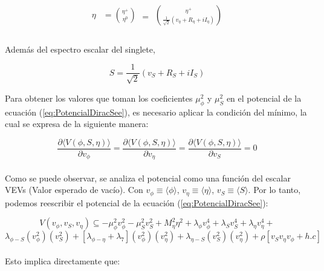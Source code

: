 \documentclass[12pt]{article}
\begin{document}
\begin{equation}
\label{eq:campoeta}
\begin{aligned}
 \eta & = \binom{\eta^{+}}{\eta^{0} } \\ 
\end{aligned} = 
\begin{aligned}
 \binom{\eta^{+}}{\frac{1}{\sqrt{2}}(v_\eta + R_\eta + iI_\eta) } \\ 
\end{aligned}
\end{equation} \\

Además del  espectro escalar del singlete,

\begin{equation}
    \label{eq:singlete}
    S=\frac{1}{\sqrt{2}}(v_S+ R_S+iI_S)
\end{equation}


Para obtener los valores que toman los coeficientes \( \mu_\phi^2\) y \( \mu_S^2\) en el potencial de la ecuación (\ref{eq:PotencialDiracSee}), es necesario aplicar la condición del mínimo, la cual se expresa de la siguiente manera: 



\begin{equation}
    \frac{\partial{\langle V(\phi, S, \eta) }\rangle }{\partial v_\phi} = \frac{\partial{\langle V(\phi, S, \eta) }\rangle }{\partial v_\eta}= \frac{\partial{\langle V(\phi, S, \eta) }\rangle }{\partial v_S}= 0
\end{equation}\\ 

Como se puede observar, se analiza el potencial como una función del escalar VEVs (Valor esperado de vacío). Con  $v_\phi \equiv \langle \phi \rangle$,  $v_\eta \equiv \langle \eta \rangle$, $v_S \equiv \langle S \rangle$. Por lo tanto, podemos reescribir  el potencial  de la ecuación     (\ref{eq:PotencialDiracSee}): 

  \begin{equation}
     \label{eq:PotencialDiracSee2}
          V(v_\phi, v_S, v_\eta) \subseteq  -\mu_\phi^2 v_\phi^2 -  \mu_S^2 v_S^2 + M_\eta^2\eta^2 + \lambda_\phi v_\phi^4+ \lambda_S v_S^4 + \lambda_\eta v_\eta^4 +
    \end{equation}
\[   \lambda_{\phi-S}(v_\phi^2)(v_S ^2)+ [\lambda_{\phi-\eta}+\lambda_7](v_\phi^2)(v_\eta^2)+    \lambda_{\eta-S}(v_S^2 )(v_\eta^2)  + \rho [ v_S v_\eta v_\phi+ h.c]  \] \\


Esto implica directamente que: 
\end{document}
